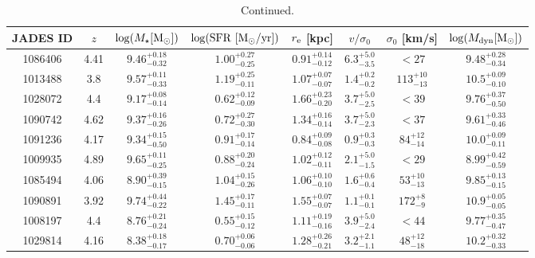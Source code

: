 \begin{table}
\ContinuedFloat
    \centering
    \begin{tabular}{c|c|c|c|c|c|c|c}
         JADES ID & $z$ & $\log (M_{\star} \rm [M_{\odot}])$ & $\rm \log (SFR ~ [M_{\odot}/yr])$ & $r_{\rm e}$ [kpc] &  $v/\sigma_0$ & $\sigma_0$ [km/s] & $\log (M_{\rm dyn} \rm [M_{\odot}])$\\
\hline
 1086406 &     4.41 & $9.46^{+0.18}_{-0.32}$  & $1.00^{+0.27}_{-0.25}$ & $0.91^{+0.14}_{-0.12}$ & $6.3^{+5.0}_{-3.5}$  & $<27$   & $9.48^{+0.28}_{-0.34}$ \\
 1013488 &     3.8  & $9.57^{+0.11}_{-0.33}$  & $1.19^{+0.25}_{-0.11}$ & $1.07^{+0.07}_{-0.07}$ & $1.4^{+0.2}_{-0.2}$  & $113^{+10}_{-13}$ & $10.5^{+0.09}_{-0.10}$ \\
 1028072 &     4.4  & $9.17^{+0.08}_{-0.14}$  & $0.62^{+0.12}_{-0.09}$ & $1.66^{+0.23}_{-0.20}$ & $3.7^{+5.0}_{-2.5}$  & $<39$  & $9.76^{+0.37}_{-0.50}$ \\
 1090742 &     4.62 & $9.37^{+0.16}_{-0.26}$  & $0.72^{+0.27}_{-0.30}$ & $1.34^{+0.16}_{-0.14}$ & $3.7^{+5.0}_{-2.3}$  & $<37$  & $9.61^{+0.33}_{-0.46}$ \\
 1091236 &     4.17 & $9.34^{+0.15}_{-0.50}$  & $0.91^{+0.17}_{-0.14}$ & $0.84^{+0.09}_{-0.08}$ & $0.9^{+0.3}_{-0.3}$  & $84^{+12}_{-14}$  & $10.0^{+0.09}_{-0.11}$ \\
 1009935 &     4.89 & $9.65^{+0.11}_{-0.25}$  & $0.88^{+0.20}_{-0.24}$ & $1.02^{+0.12}_{-0.11}$ & $2.1^{+5.0}_{-1.5}$  & $<29$   & $8.99^{+0.42}_{-0.59}$ \\
 1085494 &     4.06 & $8.90^{+0.39}_{-0.15}$  & $1.04^{+0.15}_{-0.26}$ & $1.06^{+0.10}_{-0.10}$ & $1.6^{+0.6}_{-0.4}$  & $53^{+10}_{-13}$  & $9.85^{+0.13}_{-0.15}$ \\
 1090891 &     3.92 & $9.74^{+0.44}_{-0.22}$  & $1.45^{+0.17}_{-0.11}$ & $1.55^{+0.07}_{-0.07}$ & $1.1^{+0.1}_{-0.1}$  & $172^{+8}_{-9}$   & $10.9^{+0.05}_{-0.05}$ \\
 1008197 &     4.4  & $8.76^{+0.21}_{-0.24}$  & $0.55^{+0.15}_{-0.12}$ & $1.11^{+0.19}_{-0.16}$ & $3.9^{+5.0}_{-2.4}$  & $<44$  & $9.77^{+0.35}_{-0.47}$ \\
 1029814 &     4.16 & $8.38^{+0.18}_{-0.17}$  & $0.70^{+0.06}_{-0.06}$ & $1.28^{+0.26}_{-0.21}$ & $3.2^{+2.1}_{-1.1}$  & $48^{+12}_{-18}$  & $10.2^{+0.32}_{-0.33}$ \\
    \end{tabular}
    \caption{Continued.}
\end{table}
